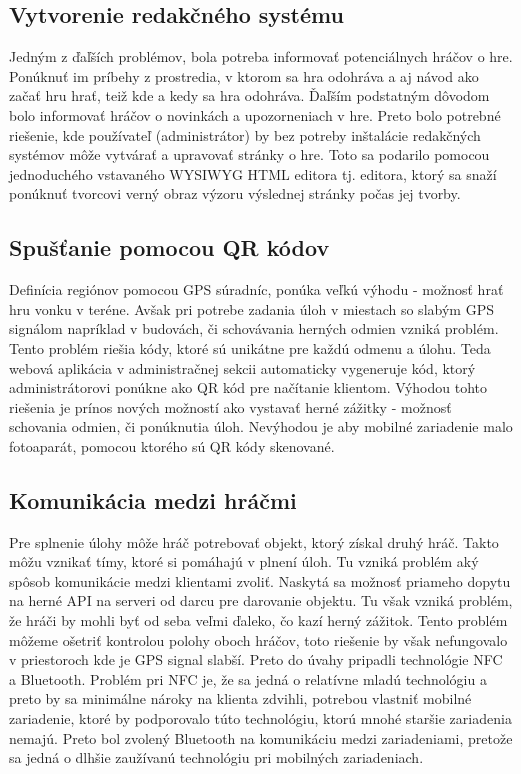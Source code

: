 \subsection{Vytvorenie redakčného systému}
Jedným z ďaľších problémov, bola potreba informovať potenciálnych hráčov o hre. Ponúknuť im príbehy z prostredia, v ktorom sa hra odohráva a aj návod ako začať hru hrať, teiž kde a kedy sa hra odohráva. Ďaľším podstatným dôvodom bolo informovať hráčov o novinkách a upozorneniach v hre. Preto bolo potrebné riešenie, kde používateľ (administrátor) by bez potreby inštalácie redakčných systémov môže vytvárať a upravovať stránky o hre. Toto sa podarilo pomocou jednoduchého vstavaného WYSIWYG HTML editora  tj. editora, ktorý sa snaží ponúknuť tvorcovi verný obraz výzoru výslednej stránky počas jej tvorby.

\subsection{Spušťanie pomocou QR kódov}

Definícia regiónov pomocou GPS súradníc, ponúka veľkú výhodu - možnosť hrať hru vonku v teréne. Avšak pri potrebe zadania úloh v miestach so slabým GPS signálom napríklad v budovách, či schovávania herných odmien vzniká problém. Tento problém riešia kódy, ktoré sú unikátne pre každú odmenu a úlohu. Teda webová aplikácia v administračnej sekcii automaticky vygeneruje kód, ktorý administrátorovi ponúkne ako QR kód pre načítanie klientom. Výhodou tohto riešenia je prínos nových možností ako vystavať herné zážitky - možnosť schovania odmien, či ponúknutia úloh. Nevýhodou je aby mobilné zariadenie malo fotoaparát, pomocou ktorého sú QR kódy skenované.

\subsection{Komunikácia medzi hráčmi}
Pre splnenie úlohy môže hráč potrebovať objekt, ktorý získal druhý hráč. Takto môžu vznikať tímy, ktoré si pomáhajú v plnení úloh. Tu vzniká problém aký spôsob komunikácie medzi klientami zvoliť. Naskytá sa možnosť priameho dopytu na herné API na serveri od darcu pre darovanie objektu. Tu však vzniká problém, že hráči by mohli byť od seba veľmi ďaleko, čo kazí herný zážitok. Tento problém môžeme ošetriť kontrolou polohy oboch hráčov, toto riešenie by však nefungovalo v priestoroch kde je GPS signal slabší. Preto do úvahy pripadli technológie NFC a Bluetooth. Problém pri NFC je, že sa jedná o relatívne mladú technológiu a preto by sa minimálne nároky na klienta zdvihli, potrebou vlastniť mobilné zariadenie, ktoré by podporovalo túto technológiu, ktorú mnohé staršie zariadenia nemajú. Preto bol zvolený Bluetooth na komunikáciu medzi zariadeniami, pretože sa jedná o dlhšie zaužívanú technológiu pri mobilných zariadeniach.



